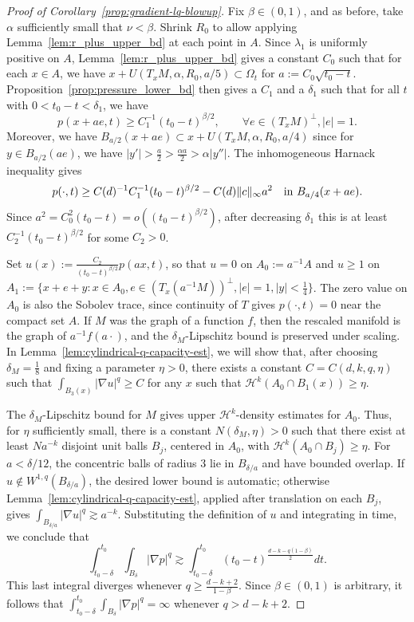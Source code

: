 \documentclass[11pt]{amsart}
\numberwithin{equation}{section}
\numberwithin{figure}{section}
\theoremstyle{plain}
\theoremstyle{definition}
\theoremstyle{remark}
\theoremstyle{plain}
\begin{document}
\begin{proof}[Proof of Corollary~\ref{prop:gradient-lq-blowup}]
    Fix $\beta\in (0,1)$, and as before, take $\alpha$ sufficiently small that $\nu < \beta$. Shrink $R_0$ to allow applying Lemma~\ref{lem:r_plus_upper_bd} at each point in $A$. Since $\lambda_1$ is uniformly positive on $A$, Lemma~\ref{lem:r_plus_upper_bd} gives a constant $C_0$ such that for each $x\in A$, we have $x + U(T_xM, \alpha, R_0, a/5) \subset \Omega_t$ for $a :=  C_0\sqrt{t_0  -t}$. Proposition~\ref{prop:pressure_lower_bd} then gives a $C_1$ and a $\delta_1$ such that for all $t$ with $0 < t_0 - t < \delta_1$, we have
    \[ p(x + ae,t) \geq C_1^{-1}(t_0 - t)^{\beta/2}, \qquad \forall e\in (T_xM)^\perp, |e| = 1. \]
    Moreover, we have $B_{a/2}(x + ae)\subset x + U(T_xM, \alpha, R_0, a/4)$ since for $y\in B_{a/2}(ae)$, we have $|y'| > \frac{a}{2} > \frac{\alpha a}{2} > \alpha|y''|$.
    The inhomogeneous Harnack inequality gives
    \[
    p(\cdot,t) \geq C(d)^{-1}C_1^{-1}(t_0-t)^{\beta/2}
        -C(d)\|c\|_\infty a^2
    \quad\hbox{in }B_{a/4}(x+ae).
    \]
    Since $a^2=C_0^2(t_0-t)=o((t_0-t)^{\beta/2})$, after decreasing $\delta_1$ this is at least $C_2^{-1}(t_0-t)^{\beta/2}$ for some $C_2>0$.
    
    Set $u(x) := \frac{C_2}{(t_0-t)^{\beta/2}}p(ax,t)$, so that $u = 0$ on $A_0 := a^{-1} A$ and $u\geq 1$ on $A_1 := \{x + e + y : x\in A_0, e\in (T_x(a^{-1}M))^\perp, |e|=1, |y| < \frac{1}{4}\}$. The zero value on $A_0$ is also the Sobolev trace, since continuity of $T$ gives $p(\cdot,t)=0$ near the compact set $A$. If $M$ was the graph of a function $f$, then the rescaled manifold is the graph of $a^{-1}f(a\cdot)$, and the $\delta_M$-Lipschitz bound is preserved under scaling. In Lemma~\ref{lem:cylindrical-q-capacity-est}, we will show that, after choosing $\delta_M = \frac{1}{8}$ and fixing a parameter $\eta > 0$, there exists a constant $C=C(d,k,q,\eta)$ such that $\int_{B_3(x)} |\nabla u|^q \geq C$ for any $x$ such that $\mathcal{H}^k(A_0\cap B_1(x)) \geq \eta$. 

    The $\delta_M$-Lipschitz bound for $M$ gives upper $\mathcal{H}^k$-density estimates for $A_0$. Thus, for $\eta$ sufficiently small, there is a constant $N(\delta_M,\eta)>0$ such that there exist at least $Na^{-k}$ disjoint unit balls $B_j$, centered in $A_0$, with $\mathcal{H}^k(A_0\cap B_j)\geq\eta$. For $a<\delta/12$, the concentric balls of radius $3$ lie in $B_{\delta/a}$ and have bounded overlap. If $u\notin W^{1,q}(B_{\delta/a})$, the desired lower bound is automatic; otherwise Lemma~\ref{lem:cylindrical-q-capacity-est}, applied after translation on each $B_j$, gives $\int_{B_{\delta/a}}|\nabla u|^q\gtrsim a^{-k}$. Substituting the definition of $u$ and integrating in time, we conclude that
    \[ \int_{t_0-\delta}^{t_0} \int_{B_{\delta}} |\nabla p|^q \gtrsim \int_{t_0 - \delta}^{t_0} (t_0-t)^{\tfrac{d-k-q(1 - \beta)}{2}}dt. \]
    This last integral diverges whenever $q \geq \frac{d-k+2}{1-\beta}$. Since $\beta\in (0,1)$ is arbitrary, it follows that $\int_{t_0-\delta}^{t_0} \int_{B_{\delta}} |\nabla p|^q = \infty$ whenever $q > d-k + 2$.
\end{proof}
\end{document}
